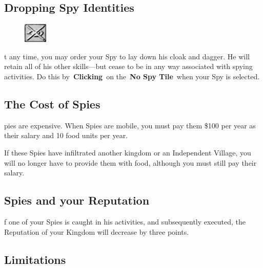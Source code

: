 \subsection{Dropping Spy Identities}


\begin{figure}
	\vspace{-20pt}
	\begin{center}
		\includegraphics[width=0.1\textwidth]{Tnospy}
	\end{center}
	\vspace{-20pt}
\end{figure}

t any time, you may order your Spy to lay down his cloak and dagger. He will retain all of his other skills---but cease to be in any way associated with spying activities. Do this by \textbf{Clicking} on the \textbf{No Spy Tile} when your Spy is selected.

\subsection{The Cost of Spies}


pies are expensive. When Spies are mobile, you must pay them \$100 per year as their salary and 10 food units per year.

If these Spies have infiltrated another kingdom or an Independent Village, you will no longer have to provide them with food, although you must still pay their salary.

\subsection{Spies and your Reputation}


f one of your Spies is caught in his activities, and subsequently executed, the Reputation of your Kingdom will decrease by three points.

\subsection{Limitations}

